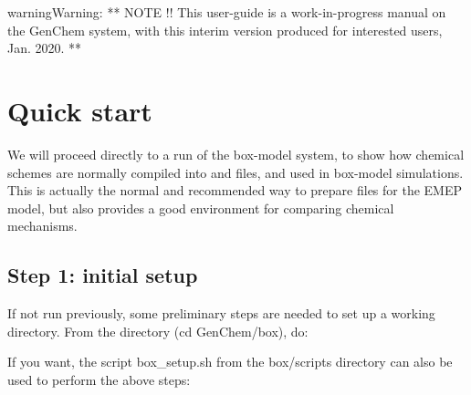 \documentclass[a4paper,10pt,english]{sphinxmanual}
\begin{document}
\begin{sphinxadmonition}{warning}{Warning:}
**  NOTE !!
This user-guide is a work-in-progress manual on the GenChem system,
with this interim version produced for interested users, Jan. 2020.
**
\end{sphinxadmonition}


\chapter{Quick start}
\label{\detokenize{GenChemDoc_quickstart:quick-start}}\label{\detokenize{GenChemDoc_quickstart::doc}}
We will proceed directly to a run of the box-model system, to show how
chemical schemes are normally compiled into  and  files, and used
in box-model simulations. This is actually the normal and recommended way to
prepare files for the EMEP model, but also provides a good environment for
comparing chemical mechanisms.


\section{Step 1: initial setup}
\label{\detokenize{GenChemDoc_quickstart:step-1-initial-setup}}
If not run previously, some preliminary steps are needed to set up a
working directory.  From the  directory (cd
GenChem/box), do:

\begin{sphinxVerbatim}[commandchars=\\\{\}]
 
 

 

  
  
  
  
  
\end{sphinxVerbatim}

If you want, the script box\_setup.sh from the box/scripts directory can also be
used to perform the above steps:
\end{document}
